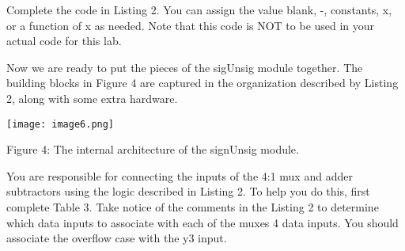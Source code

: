 Complete the code in Listing 2. You can assign the value blank, -,
constants, x, or a function of x as needed. Note that this code is NOT
to be used in your actual code for this lab.

Now we are ready to put the pieces of the sigUnsig module together. The
building blocks in Figure 4 are captured in the organization described
by Listing 2, along with some extra hardware.

\texttt{[image:  image6.png]}

Figure 4: The internal architecture of the signUnsig module.

You are responsible for connecting the inputs of the 4:1 mux and adder
subtractors using the logic described in Listing 2. To help you do this,
first complete Table 3. Take notice of the comments in the Listing 2 to
determine which data inputs to associate with each of the muxes 4 data
inputs. You should associate the overflow case with the y3 input.

